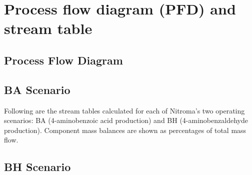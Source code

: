 \section{Process flow diagram (PFD) and stream table}
\label{app:PFD}

\subsection{Process Flow Diagram}


\subsection{BA Scenario}

Following are the stream tables calculated for each of Nitroma's two operating scenarios: BA (4-aminobenzoic acid production) and BH (4-aminobenzaldehyde production). Component mass balances are shown as percentages of total mass flow.



\subsection{BH Scenario}


